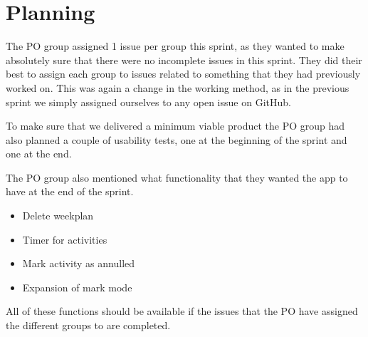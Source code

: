 \section{Planning}
The PO group assigned 1 issue per group this sprint, as they wanted to make absolutely sure that there were no incomplete issues in this sprint. 
They did their best to assign each group to issues related to something that they had previously worked on.
This was again a change in the working method, as in the previous sprint we simply assigned ourselves to any open issue on GitHub.

To make sure that we delivered a minimum viable product the PO group had also planned a couple of usability tests, one at the beginning of the sprint and one at the end.

The PO group also mentioned what functionality that they wanted the app to have at the end of the sprint.

\begin{itemize}
  \item Delete weekplan
  \item Timer for activities
  \item Mark activity as annulled
  \item Expansion of mark mode
\end{itemize}

All of these functions should be available if the issues that the PO have assigned the different groups to are completed.
